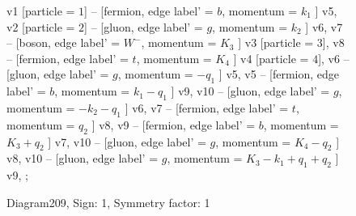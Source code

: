 \documentclass{revtex4}
\begin{document}
\begin{figure}[!htb]
\begin{center}
{v1 [particle = \(1\)] -- [fermion, edge label' = \(b\), momentum = \(k_{1}\) ] v5, 
v2 [particle = \(2\)] -- [gluon, edge label' = \(g\), momentum = \(k_{2}\) ] v6, 
v7 -- [boson, edge label' = \(W^{-}\), momentum = \(K_{3}\) ] v3 [particle = \(3\)], 
v8 -- [fermion, edge label' = \(t\), momentum = \(K_{4}\) ] v4 [particle = \(4\)], 
v6 -- [gluon, edge label' = \(g\), momentum = \(-q_{1}\) ] v5, 
v5 -- [fermion, edge label' = \(b\), momentum = \(k_{1} - q_{1}\) ] v9, 
v10 -- [gluon, edge label' = \(g\), momentum = \(-k_{2} - q_{1}\) ] v6, 
v7 -- [fermion, edge label' = \(t\), momentum = \(q_{2}\) ] v8, 
v9 -- [fermion, edge label' = \(b\), momentum = \(K_{3} + q_{2}\) ] v7, 
v10 -- [gluon, edge label' = \(g\), momentum = \(K_{4} - q_{2}\) ] v8, 
v10 -- [gluon, edge label' = \(g\), momentum = \(K_{3} - k_{1} + q_{1} + q_{2}\) ] v9, 
};
\end{center}
\caption{Diagram209, Sign: 1, Symmetry factor: 1}
\end{figure}
\newpage
\end{document}
